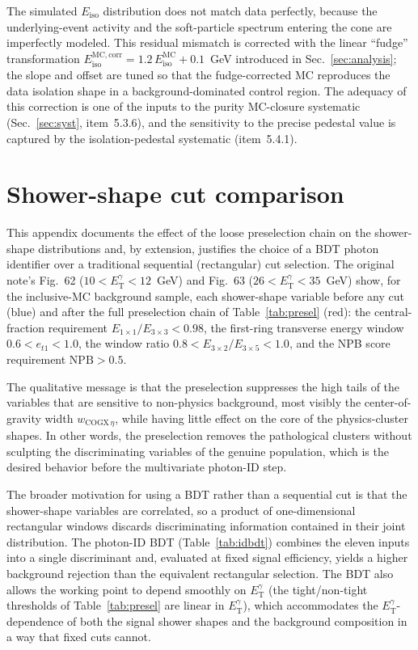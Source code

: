 \documentclass[11pt]{article}
\newcommand{\ETg}{E_{\mathrm{T}}^{\gamma}}
\newcommand{\Eiso}{E_{\mathrm{iso}}}
\begin{document}
The simulated $\Eiso$ distribution does not match data perfectly, because the
underlying-event activity and the soft-particle spectrum entering the cone are
imperfectly modeled. This residual mismatch is corrected with the linear
``fudge'' transformation
$\Eiso^{\mathrm{MC,corr}} = 1.2\,\Eiso^{\mathrm{MC}} + 0.1$~GeV introduced in
Sec.~\ref{sec:analysis}; the slope and offset are tuned so that the
fudge-corrected MC reproduces the data isolation shape in a background-dominated
control region. The adequacy of this correction is one of the inputs to the
purity MC-closure systematic (Sec.~\ref{sec:syst}, item~5.3.6), and the
sensitivity to the precise pedestal value is captured by the isolation-pedestal
systematic (item~5.4.1).

\section{Shower-shape cut comparison}
\label{app:cutcomp}
This appendix documents the effect of the loose preselection chain on the
shower-shape distributions and, by extension, justifies the choice of a BDT
photon identifier over a traditional sequential (rectangular) cut selection. The
original note's Fig.~62 ($10<\ETg<12$~GeV) and Fig.~63 ($26<\ETg<35$~GeV) show,
for the inclusive-MC background sample, each shower-shape variable before any cut
(blue) and after the full preselection chain of Table~\ref{tab:presel}
(red): the central-fraction requirement $E_{1\times1}/E_{3\times3}<0.98$, the
first-ring transverse energy window $0.6<e_{t1}<1.0$, the window ratio
$0.8<E_{3\times2}/E_{3\times5}<1.0$, and the NPB score requirement
$\mathrm{NPB}>0.5$.

The qualitative message is that the preselection suppresses the high tails of the
variables that are sensitive to non-physics background, most visibly the
center-of-gravity width $w_{\mathrm{COGX}\,\eta}$, while having little effect on
the core of the physics-cluster shapes. In other words, the preselection removes
the pathological clusters without sculpting the discriminating variables of the
genuine population, which is the desired behavior before the multivariate
photon-ID step.

The broader motivation for using a BDT rather than a sequential cut is that the
shower-shape variables are correlated, so a product of one-dimensional
rectangular windows discards discriminating information contained in their joint
distribution. The photon-ID BDT (Table~\ref{tab:idbdt}) combines the eleven
inputs into a single discriminant and, evaluated at fixed signal efficiency,
yields a higher background rejection than the equivalent rectangular selection.
The BDT also allows the working point to depend smoothly on $\ETg$ (the
tight/non-tight thresholds of Table~\ref{tab:presel} are linear in $\ETg$), which
accommodates the $\ETg$-dependence of both the signal shower shapes and the
background composition in a way that fixed cuts cannot.
\end{document}
